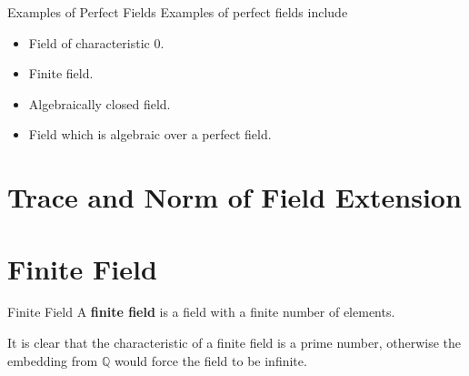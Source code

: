 \begin{example}{Examples of Perfect Fields}{}
    Examples of perfect fields include
    \begin{itemize}
        \item Field of characteristic $0$.
        \item Finite field.
        \item Algebraically closed field.
        \item Field which is algebraic over a perfect field.
    \end{itemize}
\end{example}


\section{Trace and Norm of Field Extension}

\section{Finite Field}

\begin{definition}{Finite Field}{}
    A \textbf{finite field} is a field with a finite number of elements.
\end{definition}
It is clear that the characteristic of a finite field is a prime number, otherwise the embedding from $\mathbb{Q}$ would force the field to be infinite.

